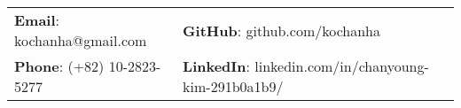 \documentclass[letterpaper, 11pt]{article}
\begin{document}


\vspace{0.5cm} 
\begin{flushleft}
\begin{tabular}{lll}
\textbf{Email}: kochanha@gmail.com      &
\hspace{0.55in} \textbf{GitHub}: github.com/kochanha \\


\textbf{Phone}: (+82) 10-2823-5277   & 
\hspace{0.55in} \textbf{LinkedIn}: linkedin.com/in/chanyoung-kim-291b0a1b9/   & 
\end{tabular}
\end{flushleft}


\setlength{\tabcolsep}{8pt}
\end{document}
